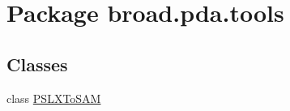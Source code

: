 \hypertarget{namespacebroad_1_1pda_1_1tools}{\section{Package broad.\+pda.\+tools}
\label{namespacebroad_1_1pda_1_1tools}
}
\subsection*{Classes}
\begin{DoxyCompactItemize}
\item 
class \hyperlink{classbroad_1_1pda_1_1tools_1_1_p_s_l_x_to_s_a_m}{P\+S\+L\+X\+To\+S\+A\+M}
\end{DoxyCompactItemize}
